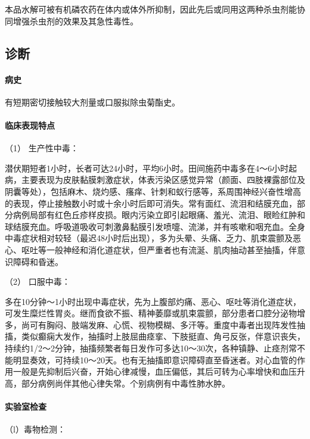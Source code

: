 本品水解可被有机磷农药在体内或体外所抑制，因此先后或同用这两种杀虫剂能协同增强杀虫剂的效果及其急性毒性。

\subsection{诊断}

\paragraph{病史}

有短期密切接触较大剂量或口服拟除虫菊酯史。

\paragraph{临床表现特点}

\hypertarget{text00140.htmlux5cux23CHP5-3-2-2-2-1}{}
（1） 生产性中毒：

潜伏期短者1小时，长者可达24小时，平均6小时。田间施药中毒多在4～6小时起病，主要表现为皮肤黏膜刺激症状，体表污染区感觉异常（颜面、四肢裸露部位及阴囊等处），包括麻木、烧灼感、瘙痒、针刺和蚁行感等，系周围神经兴奋性增高的表现，停止接触数小时或十余小时后即可消失。常有面红、流泪和结膜充血，部分病例局部有红色丘疹样皮损。眼内污染立即引起眼痛、羞光、流泪、眼睑红肿和球结膜充血。呼吸道吸收可刺激鼻黏膜引发喷嚏、流涕，并有咳嗽和咽充血。全身中毒症状相对较轻（最迟48小时后出现），多为头晕、头痛、乏力、肌束震颤及恶心、呕吐等一般神经和消化道症状，但严重者也有流涎、肌肉抽动甚至抽搐，伴意识障碍和昏迷。

\hypertarget{text00140.htmlux5cux23CHP5-3-2-2-2-2}{}
（2） 口服中毒：

多在10分钟～1小时出现中毒症状，先为上腹部灼痛、恶心、呕吐等消化道症状，可发生糜烂性胃炎。继而食欲不振、精神萎靡或肌束震颤，部分患者口腔分泌物增多，尚可有胸闷、肢端发麻、心慌、视物模糊、多汗等。重度中毒者出现阵发性抽搐，类似癫痫大发作，抽搐时上肢屈曲痉挛、下肢挺直、角弓反张，伴意识丧失，持续约1/2～2分钟，抽搐频繁者每日发作可多达10～30次，各种镇静、止痉剂常不能明显奏效，可持续10～20天。也有无抽搐即意识障碍直至昏迷者。对心血管的作用一般是先抑制后兴奋，开始心律减慢，血压偏低，其后可转为心率增快和血压升高，部分病例尚伴其他心律失常。个别病例有中毒性肺水肿。

\paragraph{实验室检查}

\hypertarget{text00140.htmlux5cux23CHP5-3-2-2-3-1}{}
（l）毒物检测：

